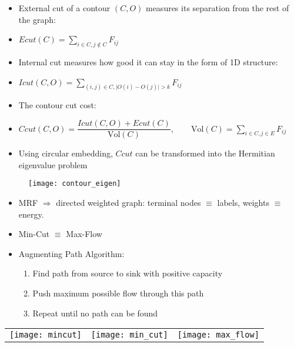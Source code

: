 \documentclass[11pt, a4paper, landscape]{article}
\begin{document}
\NewPage{}
\vfill
\begin{itemize}
\item External cut of a contour $(C, O)$ measures its separation from the rest of the graph:
\item[]
\begin{center}
$Ecut(C) = \sum\limits_{i \in C, j \notin C} F_{ij}$
\end{center}
\item Internal cut measures how good it can stay in the form of 1D structure:
\item[]
\begin{center}
$Icut(C, O) = \sum\limits_{(i, j) \in C, \lvert O(i) - O(j) \rvert > k} F_{ij}$
\end{center}
\item The contour cut cost:
\item[]
\begin{center}
$Ccut(C, O) = \dfrac{Icut(C, O) + Ecut(C)}{\mathrm{Vol}(C)}, \qquad \mathrm{Vol}(C) = \sum\limits_{i \in C, j \in E} F_{ij}$
\end{center}
\item Using circular embedding, $Ccut$ can be transformed into the Hermitian eigenvalue problem
\end{itemize}
\begin{figure}[htbp]
\centering
\texttt{[image: contour\_eigen]}
\end{figure}
\vfill





\NewPage{}
\vfill
\begin{itemize}
\item MRF $\Rightarrow$ directed weighted graph: terminal nodes $\equiv$ labels, weights $\equiv$ energy.
\item Min-Cut $\equiv$ Max-Flow
\item Augmenting Path Algorithm:
\begin{enumerate}
\item Find path from source to sink with positive capacity
\item Push maximum possible flow through this path
\item Repeat until no path can be found
\end{enumerate}
\end{itemize}
\begin{table}
  \centering
  \begin{tabular}{@{} M{.3\linewidth} M{.3\linewidth} M{.3\linewidth} @{}}
      \texttt{[image: mincut]}%
      &
      \texttt{[image: min\_cut]}%
      &
      \texttt{[image: max\_flow]}%
  \end{tabular}
\end{table}
\vfill
\end{document}
